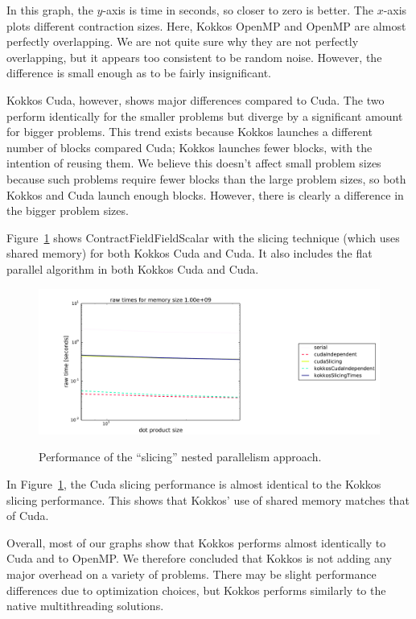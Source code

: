 In this graph, the $y$-axis is time in seconds, so closer to zero is better. The
$x$-axis plots different contraction sizes.  Here, Kokkos OpenMP and OpenMP are
almost perfectly overlapping. We are not quite sure why they are not perfectly
overlapping, but it appears too consistent to be random noise. However, the
difference is small enough as to be fairly insignificant. 

Kokkos Cuda, however, shows major differences compared to Cuda. The two perform
identically for the smaller problems but diverge by a significant amount for
bigger problems. This trend exists because Kokkos launches a different number of
blocks compared Cuda; Kokkos launches fewer blocks, with the intention of
reusing them.  We believe this doesn't affect small problem sizes because such
problems require fewer blocks than the large problem sizes, so both Kokkos and
Cuda launch enough blocks.  However, there is clearly a difference in the bigger
problem sizes. 

Figure~\ref{fig:cffscomparison} shows ContractFieldFieldScalar with the slicing
technique (which uses shared memory) for both Kokkos Cuda and Cuda.  It also
includes the flat parallel algorithm in both Kokkos Cuda and Cuda.

\begin{figure}[!ht]
{\includegraphics[scale=.4]{CFFS_RawTimes_2d_largest_Comparison.pdf}}
\caption[ContractFieldFieldScalar Kokkos performance comparison]{
    Performance of the ``slicing'' nested parallelism approach.}
\label{fig:cffscomparison}
\end{figure}

In Figure~\ref{fig:cffscomparison}, the Cuda slicing performance is almost
identical to the Kokkos slicing performance. This shows that Kokkos' use of
shared memory matches that of Cuda.

Overall, most of our graphs show that Kokkos performs almost identically to Cuda
and to OpenMP.  We therefore concluded that Kokkos is not adding any major
overhead on a variety of problems. 
There may be slight performance differences due to optimization choices, but
Kokkos performs similarly to the native multithreading solutions.


